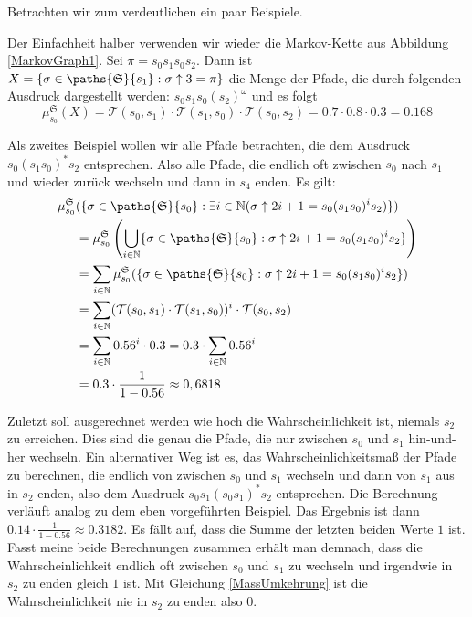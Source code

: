 Betrachten wir zum verdeutlichen ein paar Beispiele.
\begin{example}[Wahrscheinlichkeitsmaße]
	Der Einfachheit halber verwenden wir wieder die Markov-Kette aus Abbildung \ref{MarkovGraph1}. Sei $\pi=s_0s_1s_0s_2$. 
	Dann ist $X=\{\sigma \in \paths{\mathfrak{S}}{s_1} : \sigma\uparrow 3 = \pi\}$ die Menge der Pfade, die durch folgenden Ausdruck dargestellt werden: $s_0s_1s_0(s_2)^\omega$ und es folgt
	$$\mu^\mathfrak{S}_{s_0}(X)=\mathcal{T}(s_0,s_1) \cdot \mathcal{T}(s_1,s_0) \cdot \mathcal{T}(s_0,s_2) = 0.7 \cdot 0.8 \cdot 0.3 = 0.168$$
	
	Als zweites Beispiel wollen wir alle Pfade betrachten, die dem Ausdruck $s_0(s_1s_0)^\ast s_2$ entsprechen. Also alle Pfade, die endlich oft zwischen $s_0$ nach $s_1$ und wieder zurück wechseln und dann in $s_4$ enden. Es gilt:
	\begin{align*}
		\mu^\mathfrak{S}_{s_0}&(\{\sigma\in \paths{\mathfrak{S}}{s_0} : \exists i\in \mathbb{N} (\sigma\uparrow 2i+1 = s_0(s_1s_0)^i s_2)\}) \\
		&=\mu^\mathfrak{S}_{s_0} \left(\bigcup_{i\in \mathbb{N}} \{\sigma\in \paths{\mathfrak{S}}{s_0} : \sigma\uparrow 2i+1 = s_0(s_1s_0)^i s_2\}\right) \\
		&=\sum_{i\in \mathbb{N}} \mu^\mathfrak{S}_{s_0}(\{\sigma\in \paths{\mathfrak{S}}{s_0} : \sigma\uparrow 2i+1 = s_0(s_1s_0)^i s_2\}) \\
		&=\sum_{i\in \mathbb{N}} (\mathcal{T}(s_0, s_1) \cdot \mathcal{T}(s_1, s_0))^i \cdot \mathcal{T}(s_0,s_2) \\
		&=\sum_{i\in \mathbb{N}} 0.56^i \cdot 0.3 = 0.3 \cdot \sum_{i\in \mathbb{N}} 0.56^i \\
		&= 0.3 \cdot \frac{1}{1-0.56} \approx 0,6818
	\end{align*}
	
	Zuletzt soll ausgerechnet werden wie hoch die Wahrscheinlichkeit ist, niemals $s_2$ zu erreichen. Dies sind die genau die Pfade, die nur zwischen $s_0$ und $s_1$ hin-und-her wechseln. Ein alternativer Weg ist es, das Wahrscheinlichkeitsmaß der Pfade zu berechnen, die endlich von zwischen $s_0$ und $s_1$ wechseln und dann von $s_1$ aus in $s_2$ enden, also dem Ausdruck $s_0s_1(s_0s_1)^\ast s_2$ entsprechen. Die Berechnung verläuft analog zu dem eben vorgeführten Beispiel. Das Ergebnis ist dann $0.14\cdot\frac{1}{1-0.56} \approx 0.3182$. Es fällt auf, dass die Summe der letzten beiden Werte $1$ ist. Fasst meine beide Berechnungen zusammen erhält man demnach, dass die Wahrscheinlichkeit endlich oft zwischen $s_0$ und $s_1$ zu wechseln und irgendwie in $s_2$ zu enden gleich $1$ ist. Mit Gleichung \ref{MassUmkehrung} ist die Wahrscheinlichkeit nie in $s_2$ zu enden also $0$.
\end{example}

